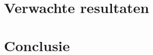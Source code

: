 \documentclass{hogent-article}
\begin{document}
\lipsum[10-12]

\section{Verwachte resultaten}%
\label{sec:verwachte-resultaten}


\lipsum[14-18]

\section{Conclusie}%
\label{sec:discussie-conclusie}

\lipsum[19-21]


\printbibliography[heading=bibintoc]
\end{document}
